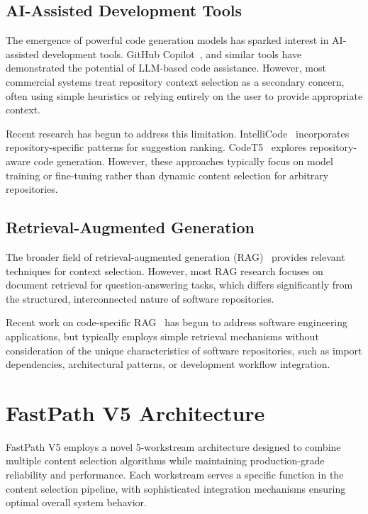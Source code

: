\documentclass[conference]{IEEEtran}
\begin{document}
\subsection{AI-Assisted Development Tools}

The emergence of powerful code generation models has sparked interest in AI-assisted development tools. GitHub Copilot~\cite{chen2021evaluating}, and similar tools have demonstrated the potential of LLM-based code assistance. However, most commercial systems treat repository context selection as a secondary concern, often using simple heuristics or relying entirely on the user to provide appropriate context.

Recent research has begun to address this limitation. IntelliCode~\cite{svyatkovskiy2019intellicode} incorporates repository-specific patterns for suggestion ranking. CodeT5~\cite{wang2021codet5} explores repository-aware code generation. However, these approaches typically focus on model training or fine-tuning rather than dynamic content selection for arbitrary repositories.

\subsection{Retrieval-Augmented Generation}

The broader field of retrieval-augmented generation (RAG)~\cite{lewis2020retrieval} provides relevant techniques for context selection. However, most RAG research focuses on document retrieval for question-answering tasks, which differs significantly from the structured, interconnected nature of software repositories.

Recent work on code-specific RAG~\cite{zhou2023docprompting} has begun to address software engineering applications, but typically employs simple retrieval mechanisms without consideration of the unique characteristics of software repositories, such as import dependencies, architectural patterns, or development workflow integration.

\section{FastPath V5 Architecture}

FastPath V5 employs a novel 5-workstream architecture designed to combine multiple content selection algorithms while maintaining production-grade reliability and performance. Each workstream serves a specific function in the content selection pipeline, with sophisticated integration mechanisms ensuring optimal overall system behavior.
\end{document}
